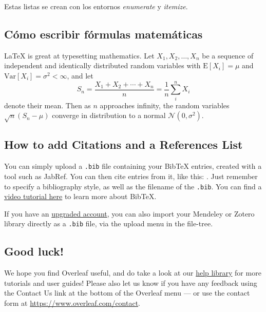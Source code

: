 \documentclass{article}
\begin{document}
Estas listas se crean con los entornos \emph{enumerate} y \emph{itemize}.

\subsection{Cómo escribir fórmulas matemáticas}

\LaTeX{} is great at typesetting mathematics. Let $X_1, X_2, \ldots, X_n$ be a sequence of independent and identically distributed random variables with $\text{E}[X_i] = \mu$ and $\text{Var}[X_i] = \sigma^2 < \infty$, and let
\[S_n = \frac{X_1 + X_2 + \cdots + X_n}{n}
      = \frac{1}{n}\sum_{i}^{n} X_i\]
denote their mean. Then as $n$ approaches infinity, the random variables $\sqrt{n}(S_n - \mu)$ converge in distribution to a normal $\mathcal{N}(0, \sigma^2)$.

\subsection{How to add Citations and a References List}

You can simply upload a \verb|.bib| file containing your BibTeX entries, created with a tool such as JabRef. You can then cite entries from it, like this: \cite{greenwade93}. Just remember to specify a bibliography style, as well as the filename of the \verb|.bib|. You can find a \href{https://www.overleaf.com/help/97-how-to-include-a-bibliography-using-bibtex}{video tutorial here} to learn more about BibTeX.

If you have an \href{https://www.overleaf.com/user/subscription/plans}{upgraded account}, you can also import your Mendeley or Zotero library directly as a \verb|.bib| file, via the upload menu in the file-tree.

\subsection{Good luck!}

We hope you find Overleaf useful, and do take a look at our \href{https://www.overleaf.com/learn}{help library} for more tutorials and user guides! Please also let us know if you have any feedback using the Contact Us link at the bottom of the Overleaf menu --- or use the contact form at \url{https://www.overleaf.com/contact}.



\end{document}
